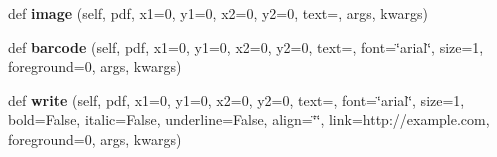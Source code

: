 \begin{DoxyCompactItemize}
\item 
def {\bfseries image} (self, pdf, x1=0, y1=0, x2=0, y2=0, text=\textquotesingle{}\textquotesingle{}, args, kwargs)\hypertarget{class_libraries_1_1fpdf_1_1template_1_1_template_a9e73bf2e501048a2cecc70df6684c993}{}\label{class_libraries_1_1fpdf_1_1template_1_1_template_a9e73bf2e501048a2cecc70df6684c993}

\item 
def {\bfseries barcode} (self, pdf, x1=0, y1=0, x2=0, y2=0, text=\textquotesingle{}\textquotesingle{}, font=\char`\"{}arial\char`\"{}, size=1, foreground=0, args, kwargs)\hypertarget{class_libraries_1_1fpdf_1_1template_1_1_template_a6d29d3979950d86bcd8439bbb030e6b0}{}\label{class_libraries_1_1fpdf_1_1template_1_1_template_a6d29d3979950d86bcd8439bbb030e6b0}

\item 
def {\bfseries write} (self, pdf, x1=0, y1=0, x2=0, y2=0, text=\textquotesingle{}\textquotesingle{}, font=\char`\"{}arial\char`\"{}, size=1, bold=False, italic=False, underline=False, align=\char`\"{}\char`\"{}, link=\textquotesingle{}http\+://example.\+com\textquotesingle{}, foreground=0, args, kwargs)\hypertarget{class_libraries_1_1fpdf_1_1template_1_1_template_a510304ee7d3bccc231ba2d9dcf2cb59a}{}\label{class_libraries_1_1fpdf_1_1template_1_1_template_a510304ee7d3bccc231ba2d9dcf2cb59a}

\end{DoxyCompactItemize}
